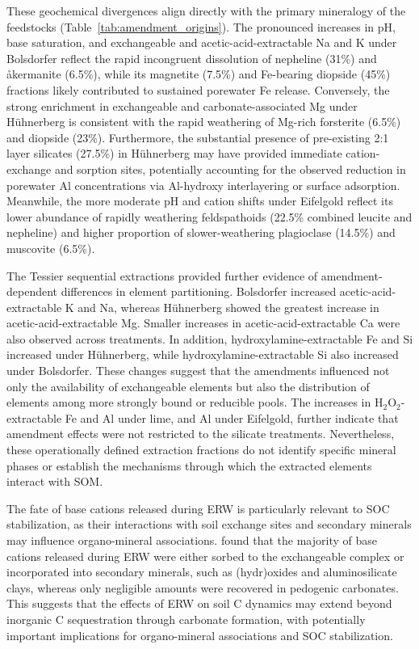 \documentclass[preprint,12pt]{elsarticle}
\begin{document}
These geochemical divergences align directly with the primary mineralogy of the feedstocks (Table~\ref{tab:amendment_origins}). The pronounced increases in pH, base saturation, and exchangeable and acetic-acid-extractable Na and K under Bolsdorfer reflect the rapid incongruent dissolution of nepheline (31\%) and \aa kermanite (6.5\%), while its magnetite (7.5\%) and Fe-bearing diopside (45\%) fractions likely contributed to sustained porewater Fe release. Conversely, the strong enrichment in exchangeable and carbonate-associated Mg under H\"uhnerberg is consistent with the rapid weathering of Mg-rich forsterite (6.5\%) and diopside (23\%). Furthermore, the substantial presence of pre-existing 2:1 layer silicates (27.5\%) in H\"uhnerberg may have provided immediate cation-exchange and sorption sites, potentially accounting for the observed reduction in porewater Al concentrations via Al-hydroxy interlayering or surface adsorption. Meanwhile, the more moderate pH and cation shifts under Eifelgold reflect its lower abundance of rapidly weathering feldspathoids (22.5\% combined leucite and nepheline) and higher proportion of slower-weathering plagioclase (14.5\%) and muscovite (6.5\%).

The Tessier sequential extractions provided further evidence of amendment-dependent differences in element partitioning. Bolsdorfer increased acetic-acid-extractable K and Na, whereas Hühnerberg showed the greatest increase in acetic-acid-extractable Mg. Smaller increases in acetic-acid-extractable Ca were also observed across treatments. In addition, hydroxylamine-extractable Fe and Si increased under Hühnerberg, while hydroxylamine-extractable Si also increased under Bolsdorfer. These changes suggest that the amendments influenced not only the availability of exchangeable elements but also the distribution of elements among more strongly bound or reducible pools. The increases in H$_2$O$_2$-extractable Fe and Al under lime, and Al under Eifelgold, further indicate that amendment effects were not restricted to the silicate treatments. Nevertheless, these operationally defined extraction fractions do not identify specific mineral phases or establish the mechanisms through which the extracted elements interact with SOM.

The fate of base cations released during ERW is particularly relevant to SOC stabilization, as their interactions with soil exchange sites and secondary minerals may influence organo-mineral associations. \citet{steinwidder2025beyond} found that the majority of base cations released during ERW were either sorbed to the exchangeable complex or incorporated into secondary minerals, such as (hydr)oxides and aluminosilicate clays, whereas only negligible amounts were recovered in pedogenic carbonates. This suggests that the effects of ERW on soil C dynamics may extend beyond inorganic C sequestration through carbonate formation, with potentially important implications for organo-mineral associations and SOC stabilization.
\end{document}
